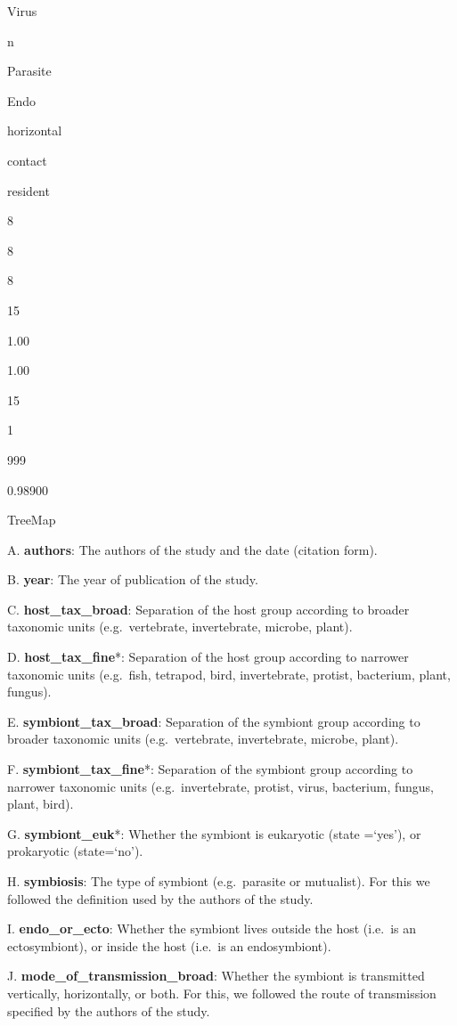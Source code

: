 \documentclass[
]{article}
\begin{document}
Virus

n

Parasite

Endo

horizontal

contact

resident

8

8

8

15

1.00

1.00

15

1

999

0.98900

TreeMap

A. \textbf{authors}: The authors of the study and the date (citation
form).

B. \textbf{year}: The year of publication of the study.

C. \textbf{host\_tax\_broad}: Separation of the host group according to
broader taxonomic units (e.g.~vertebrate, invertebrate, microbe, plant).

D. \textbf{host\_tax\_fine}*: Separation of the host group according to
narrower taxonomic units (e.g.~fish, tetrapod, bird, invertebrate,
protist, bacterium, plant, fungus).

E. \textbf{symbiont\_tax\_broad}: Separation of the symbiont group
according to broader taxonomic units (e.g.~vertebrate, invertebrate,
microbe, plant).

F. \textbf{symbiont\_tax\_fine}*: Separation of the symbiont group
according to narrower taxonomic units (e.g.~invertebrate, protist,
virus, bacterium, fungus, plant, bird).

G. \textbf{symbiont\_euk}*: Whether the symbiont is eukaryotic (state
=`yes'), or prokaryotic (state=`no').

H. \textbf{symbiosis}: The type of symbiont (e.g.~parasite or
mutualist). For this we followed the definition used by the authors of
the study.

I. \textbf{endo\_or\_ecto}: Whether the symbiont lives outside the host
(i.e.~is an ectosymbiont), or inside the host (i.e.~is an endosymbiont).

J. \textbf{mode\_of\_transmission\_broad}: Whether the symbiont is
transmitted vertically, horizontally, or both. For this, we followed the
route of transmission specified by the authors of the study.
\end{document}
